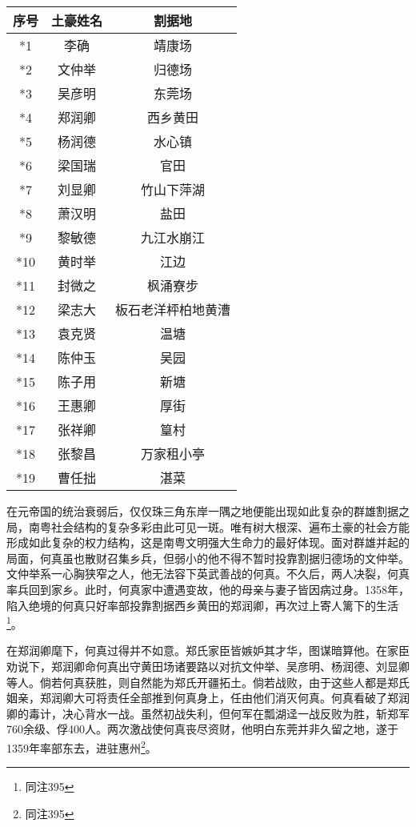 \begin{center}
	\begin{tabular}{ c c c }
		\hline
		序号 & 土豪姓名 & 割据地 \\
		\hline
		*1 & 李确 & 靖康场 \\
		*2 & 文仲举 & 归德场 \\
		*3 & 吴彦明 & 东莞场 \\
		*4 & 郑润卿 & 西乡黄田 \\
		*5 & 杨润德 & 水心镇 \\
		*6 & 梁国瑞 & 官田 \\
		*7 & 刘显卿 & 竹山下萍湖 \\
		*8 & 萧汉明 & 盐田 \\
		*9 & 黎敏德 & 九江水崩江 \\
		*10 & 黄时举 & 江边 \\
		*11 & 封微之 & 枫涌寮步 \\
		*12 & 梁志大 & 板石老洋枰柏地黄漕 \\
		*13 & 袁克贤 & 温塘 \\
		*14 & 陈仲玉 & 吴园 \\
		*15 & 陈子用 & 新塘 \\
		*16 & 王惠卿 & 厚街 \\
		*17 & 张祥卿 & 篁村 \\
		*18 & 张黎昌 & 万家租小亭 \\
		*19 & 曹任拙 & 湛菜
	\end{tabular}
\end{center}



在元帝国的统治衰弱后，仅仅珠三角东岸一隅之地便能出现如此复杂的群雄割据之局，南粤社会结构的复杂多彩由此可见一斑。唯有树大根深、遍布土豪的社会方能形成如此复杂的权力结构，这是南粤文明强大生命力的最好体现。面对群雄并起的局面，何真虽也散财召集乡兵，但弱小的他不得不暂时投靠割据归德场的文仲举。文仲举系一心胸狭窄之人，他无法容下英武善战的何真。不久后，两人决裂，何真率兵回到家乡。此时，何真家中遭遇变故，他的母亲与妻子皆因病过身。1358年，陷入绝境的何真只好率部投靠割据西乡黄田的郑润卿，再次过上寄人篱下的生活\footnote{同注395}。

在郑润卿麾下，何真过得并不如意。郑氏家臣皆嫉妒其才华，图谋暗算他。在家臣劝说下，郑润卿命何真出守黄田场诸要路以对抗文仲举、吴彦明、杨润德、刘显卿等人。倘若何真获胜，则自然能为郑氏开疆拓土。倘若战败，由于这些人都是郑氏姻亲，郑润卿大可将责任全部推到何真身上，任由他们消灭何真。何真看破了郑润卿的毒计，决心背水一战。虽然初战失利，但何军在瓢湖迳一战反败为胜，斩郑军760余级、俘400人。两次激战使何真丧尽资财，他明白东莞并非久留之地，遂于1359年率部东去，进驻惠州\footnote{同注395}。

